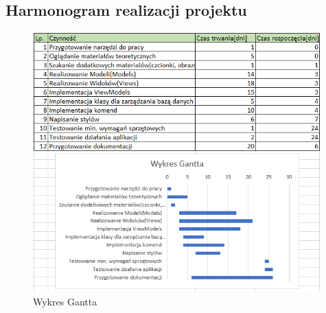 \begin{flushleft}
\section{\LARGE{Harmonogram realizacji projektu}\label{sec:harmon_proj}}
\end{flushleft}

\begin{figure}[H]
    \begin{center}
	\includegraphics[height=10cm]{images/Wykres_Gantta.png}
        \caption{Wykres Gantta}
        \label{fig:wykr_gant}
    \end{center}
\end{figure}